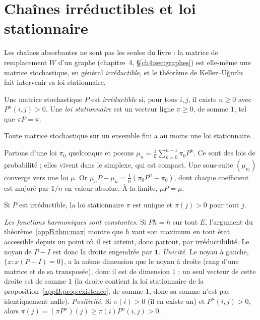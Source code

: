 \section{Chaînes irréductibles et loi stationnaire}\label{appB:sec:stat}

Les chaînes absorbantes ne sont pas les seules du livre : la matrice de remplacement $W$ d'un graphe (chapitre~4,
§\ref{ch4:sec:graphes}) est elle-même une matrice stochastique, en général \emph{irréductible}, et le théorème de
Keller--Uğurlu~\cite{ch4:KU} fait intervenir sa loi stationnaire.

\begin{definition}
Une matrice stochastique $P$ est \emph{irréductible} si, pour tous $i,j$, il existe $n\ge0$ avec $P^n(i,j)>0$. Une
\emph{loi stationnaire} est un vecteur ligne $\pi\ge0$, de somme $1$, tel que $\pi P=\pi$.
\end{definition}

\begin{proposition}[Existence]\label{appB:prop:existence}
Toute matrice stochastique sur un ensemble fini a au moins une loi stationnaire.
\end{proposition}

\begin{humanproof}
Partons d'une loi $\pi_0$ quelconque et posons $\mu_n=\frac1n\sum_{k=0}^{n-1}\pi_0P^k$. Ce sont des lois de
probabilité ; elles vivent dans le simplexe, qui est compact. Une sous-suite $(\mu_{n_l})$ converge vers une loi $\mu$.
Or $\mu_nP-\mu_n=\frac1n(\pi_0P^n-\pi_0)$, dont chaque coefficient est majoré par $1/n$ en valeur absolue. À la limite,
$\mu P=\mu$.
\end{humanproof}

\begin{proposition}\label{appB:prop:unicite}
Si $P$ est irréductible, la loi stationnaire $\pi$ est unique et $\pi(j)>0$ pour tout $j$.
\end{proposition}

\begin{humanproof}
\emph{Les fonctions harmoniques sont constantes.} Si $Ph=h$ sur tout $E$, l'argument du théorème~\ref{appB:thm:max}
montre que $h$ vaut son maximum en tout état accessible depuis un point où il est atteint, donc partout, par
irréductibilité. Le noyau de $P-I$ est donc la droite engendrée par $\mathbf 1$.
\emph{Unicité.} Le noyau à gauche, $\{x:x(P-I)=0\}$, a la même dimension que le noyau à droite (rang d'une matrice et
de sa transposée), donc il est de dimension $1$ ; un seul vecteur de cette droite est de somme $1$ (la droite contient la loi stationnaire de la proposition~\ref{appB:prop:existence}, de somme $1$, donc sa somme n'est pas identiquement nulle).
\emph{Positivité.} Si $\pi(i)>0$ (il en existe un) et $P^n(i,j)>0$, alors $\pi(j)=(\pi P^n)(j)\ge\pi(i)P^n(i,j)>0$.
\end{humanproof}


